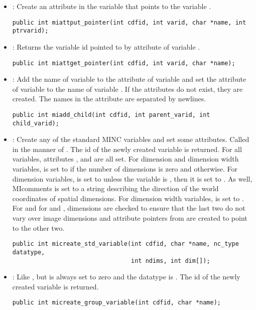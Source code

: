 \documentclass{article}
\begin{document}
\begin{itemize}
\item {} : Create an attribute  in the
variable  that points to the variable .
\begin{verbatim}
public int miattput_pointer(int cdfid, int varid, char *name, int ptrvarid);
\end{verbatim}

\item {} : Returns the variable id pointed to by
attribute  of variable .
\begin{verbatim}
public int miattget_pointer(int cdfid, int varid, char *name);
\end{verbatim}

\item {} : Add the name of variable
 to the  attribute of variable
 and set the  attribute of variable
 to the name of variable . If
the attributes do not exist, they are created. The names in the
attribute  are separated by newlines.
\begin{verbatim}
public int miadd_child(int cdfid, int parent_varid, int child_varid);
\end{verbatim}

\item {} : Create any of the standard MINC
variables and set some attributes. Called in the manner of
. The id of the newly created variable is returned.
For all variables, attributes ,
 and  are all set. For dimension
and dimension width variables,  is set to
 if the number of dimensions is zero and
 otherwise. For dimension variables,
 is set to  unless the variable is
, then it is set to . As well, 
MIcomments is set to a string describing the direction of the world
coordinates of spatial dimensions. For dimension
width variables,  is set to . For
 and for  and ,
dimensions are checked to ensure that the last two do not vary over
image dimensions and attribute pointers from  are
created to point to the other two.
\begin{verbatim}
public int micreate_std_variable(int cdfid, char *name, nc_type datatype, 
                                 int ndims, int dim[]);
\end{verbatim}

\item {} : Like
, but  is always set to zero
and the datatype is . The id of the newly created
variable is returned.
\begin{verbatim}
public int micreate_group_variable(int cdfid, char *name);
\end{verbatim}

\end{itemize}
\end{document}
